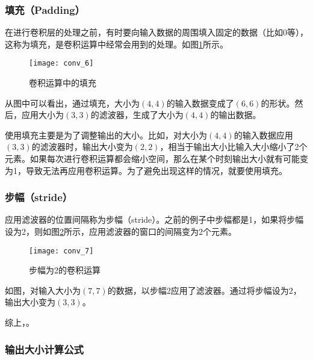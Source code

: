         \subsubsection{填充（Padding）}
        
        在进行卷积层的处理之前，有时要向输入数据的周围填入固定的数据（比如0等），这称为填充，是卷积运算中经常会用到的处理。如图\ref{fig:6}所示。
        
        \begin{figure}[!htbp]
            \centering
            \texttt{[image: conv\_6]}
            \caption{卷积运算中的填充}
            \label{fig:6}
        \end{figure}
    
        从图中可以看出，通过填充，大小为$(4, 4)$的输入数据变成了$(6, 6)$的形状。然后，应用大小为$(3, 3)$的滤波器，生成了大小为$(4, 4)$的输出数据。
        
        使用填充主要是为了调整输出的大小。比如，对大小为$(4, 4)$的输入数据应用$(3, 3)$的滤波器时，输出大小变为$(2, 2)$，相当于输出大小比输入大小缩小了2个元素。如果每次进行卷积运算都会缩小空间，那么在某个时刻输出大小就有可能变为1，导致无法再应用卷积运算。为了避免出现这样的情况，就要使用填充。
        
        \subsubsection{步幅（stride）}
        
        应用滤波器的位置间隔称为步幅（stride）。之前的例子中步幅都是1，如果将步幅设为2，则如图\ref{fig:7}所示，应用滤波器的窗口的间隔变为2个元素。
        
        \begin{figure}[!htbp]
            \centering
            \texttt{[image: conv\_7]}
            \caption{步幅为2的卷积运算}
            \label{fig:7}
        \end{figure}
    
        如图，对输入大小为$(7, 7)$的数据，以步幅2应用了滤波器。通过将步幅设为2，输出大小变为$(3, 3)$。
        
        综上，。
        
        \subsubsection{输出大小计算公式}
        

